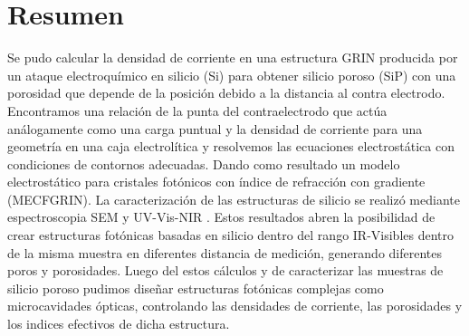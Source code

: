\documentclass[a4paper,11pt,]{book}
\begin{document}
\section{Resumen}
Se pudo calcular la densidad de corriente en una estructura GRIN producida por un ataque electroquímico en silicio (Si)  para obtener  silicio poroso (SiP) con una porosidad que depende de la posición debido a la distancia al contra electrodo. Encontramos una relación de la punta del contraelectrodo que actúa an\'alogamente como una carga puntual y la densidad de corriente para una geometr\'ia en una caja electrolítica y resolvemos las ecuaciones electrostática con condiciones de contornos adecuadas. Dando como resultado un modelo electrostático para cristales fotónicos con \'indice de refracción con gradiente (MECFGRIN). La caracterización de las estructuras de silicio se realizó mediante espectroscopia SEM  y UV-Vis-NIR . Estos resultados abren la posibilidad de crear estructuras fotónicas basadas en silicio dentro del rango IR-Visibles dentro de la misma muestra en diferentes distancia de medición, generando diferentes poros y porosidades. Luego del estos cálculos y de caracterizar las muestras de silicio poroso pudimos diseñar estructuras fot\'onicas  complejas como microcavidades \'opticas, controlando las densidades de corriente, las porosidades y los indices efectivos de dicha estructura. 
\end{document}
